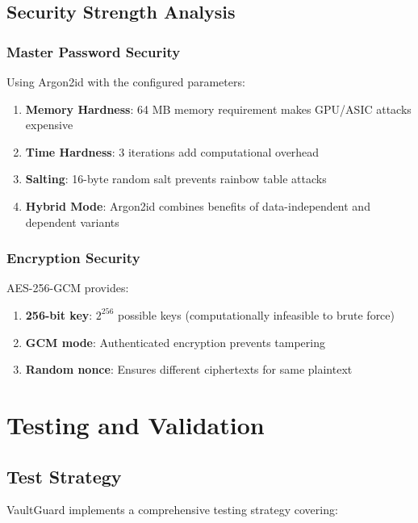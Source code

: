 \documentclass[12pt,a4paper]{report}
\begin{document}
\section{Security Strength Analysis}

\subsection{Master Password Security}

Using Argon2id with the configured parameters:

\begin{enumerate}
    \item \textbf{Memory Hardness}: 64 MB memory requirement makes GPU/ASIC attacks expensive
    \item \textbf{Time Hardness}: 3 iterations add computational overhead
    \item \textbf{Salting}: 16-byte random salt prevents rainbow table attacks
    \item \textbf{Hybrid Mode}: Argon2id combines benefits of data-independent and dependent variants
\end{enumerate}

\subsection{Encryption Security}

AES-256-GCM provides:

\begin{enumerate}
    \item \textbf{256-bit key}: $2^{256}$ possible keys (computationally infeasible to brute force)
    \item \textbf{GCM mode}: Authenticated encryption prevents tampering
    \item \textbf{Random nonce}: Ensures different ciphertexts for same plaintext
\end{enumerate}

\chapter{Testing and Validation}

\section{Test Strategy}

VaultGuard implements a comprehensive testing strategy covering:
\end{document}
